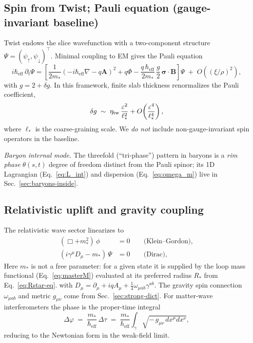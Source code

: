 \subsection{Spin from Twist; Pauli equation (gauge-invariant baseline)}
\label{sec:QM_spin}

Twist endows the slice wavefunction with a two-component structure \(\Psi=(\psi_\uparrow,\psi_\downarrow)^\top\). Minimal coupling to EM gives the Pauli equation
\begin{equation}
i\hbar_{\mathrm{eff}}\,\partial_t \Psi
= \left[\frac{1}{2m_*}\!\left(-i\hbar_{\mathrm{eff}}\nabla - q\mathbf{A}\right)^2 + q\Phi - \frac{q\,\hbar_{\mathrm{eff}}}{2m_*}\,\frac{g}{2}\,\boldsymbol{\sigma}\!\cdot\!\mathbf{B} \right]\Psi
\;+\; O\!\left((\xi/\rho)^2\right),
\label{eq:pauli}
\end{equation}
with \(g=2+\delta g\). In this framework, finite slab thickness renormalizes the Pauli coefficient,
\[
\delta g \;\sim\; \eta_{\rm tw}\,\frac{\varepsilon^2}{\ell_*^2} + O\!\left(\frac{\varepsilon^4}{\ell_*^4}\right),
\]
where \(\ell_*\) is the coarse-graining scale. We \emph{do not} include non-gauge-invariant spin operators in the baseline.

\noindent\emph{Baryon internal mode.} The threefold (``tri-phase'') pattern in baryons is a \emph{rim phase} \(\theta(s,t)\) degree of freedom distinct from the Pauli spinor; its 1D Lagrangian (Eq.~\eqref{eq:L_int}) and dispersion (Eq.~\eqref{eq:omega_m}) live in Sec.~\ref{sec:baryons-inside}.

\subsection{Relativistic uplift and gravity coupling}
\label{sec:QM_relativistic}

The relativistic wave sector linearizes to
\begin{align}
(\Box + m_*^2)\,\phi &= 0 \qquad \text{(Klein--Gordon)}, 
\label{eq:kg}\\
(i\gamma^\mu D_\mu - m_*)\,\Psi &= 0 \qquad \text{(Dirac)},
\label{eq:dirac}
\end{align}
Here \(m_*\) is not a free parameter: for a given state it is supplied by the loop mass functional (Eq.~\eqref{eq:masterM}) evaluated at its preferred radius \(R_\ast\) from Eq.~\eqref{eq:Rstar-eq}.
with \(D_\mu=\partial_\mu + iqA_\mu + \tfrac{1}{4}\omega_{\mu ab}\gamma^{ab}\). The gravity spin connection \(\omega_{\mu ab}\) and metric \(g_{\mu\nu}\) come from Sec.~\ref{sec:strong-dict}. For matter-wave interferometers the phase is the proper-time integral
\begin{equation}
\Delta \varphi \;=\; \frac{m_*}{\hbar_{\mathrm{eff}}}\,\Delta \tau \;=\; \frac{m_*}{\hbar_{\mathrm{eff}}}\int_\gamma \!\sqrt{-\,g_{\mu\nu}\,dx^\mu dx^\nu},
\label{eq:grav-phase}
\end{equation}
reducing to the Newtonian form in the weak-field limit.

